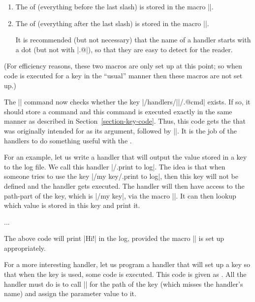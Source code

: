 \begin{enumerate}
    \item The  of  (everything before the last slash) is
        stored in the macro |\pgfkeyscurrentpath|.
    \item The  of  (everything after the last slash) is
        stored in the macro |\pgfkeyscurrentname|.

        It is recommended (but not necessary) that the name of a handler starts
        with a dot (but not with |.@|), so that they are easy to detect for the
        reader.
\end{enumerate}

(For efficiency reasons, these two macros are only set up at this point; so
when code is executed for a key in the ``usual'' manner then these macros are
not set up.)

The |\pgfkeys| command now checks whether the key
|/handlers/||/.@cmd| exists. If so, it should store a command and
this command is executed exactly in the same manner as described in
Section~\ref{section-key-code}. Thus, this code gets the  that was
originally intended for  as its argument, followed by |\pgfeov|. It
is the job of the handlers to do something useful with the .

For an example, let us write a handler that will output the value stored in a
key to the log file. We call this handler |/.print to log|. The idea is that
when someone tries to use the key |/my key/.print to log|, then this key will
not be defined and the handler gets executed. The handler will then have access
to the path-part of the key, which is |/my key|, via the macro
|\pgfkeyscurrentpath|. It can then lookup which value is stored in this key and
print it.
%
\begin{codeexample}
{%
  \pgfkeysgetvalue{\pgfkeyscurrentpath}{\temp}
  \writetolog{\temp}
}
...
\end{codeexample}
%
The above code will print |Hi!| in the log, provided the macro |\writetolog| is
set up appropriately.

For a more interesting handler, let us program a handler that will set up a key
so that when the key is used, some code is executed. This code is given as
. All the handler must do is to call |\pgfkeysdef| for the path of
the key (which misses the handler's name) and assign the parameter value to it.
%
\begin{codeexample}[]
\end{codeexample}

